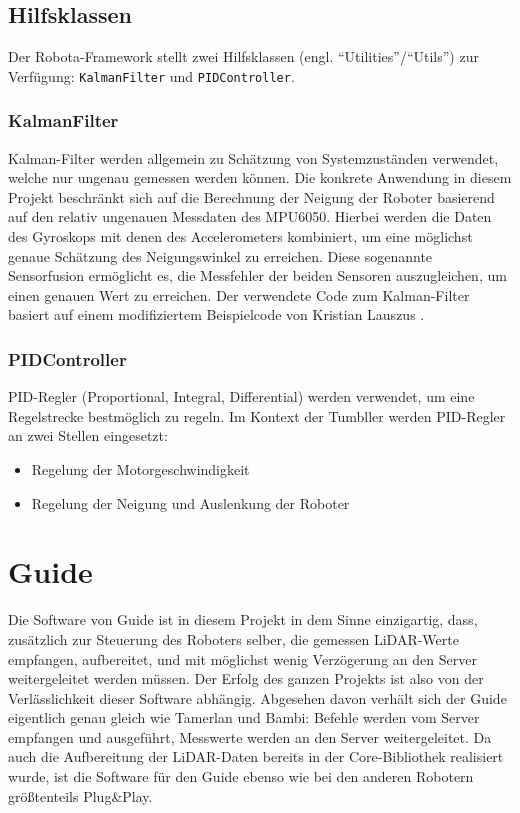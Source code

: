 \subsection{Hilfsklassen}
Der Robota-Framework stellt zwei Hilfsklassen (engl. ``Utilities''/``Utils'') zur Verfügung:
\texttt{KalmanFilter} und \texttt{PIDController}.

\subsubsection{KalmanFilter}
Kalman-Filter werden allgemein zu Schätzung von Systemzuständen verwendet,
welche nur ungenau gemessen werden können.
%
Die konkrete Anwendung in diesem Projekt beschränkt sich auf die Berechnung
der Neigung der Roboter basierend auf den relativ ungenauen Messdaten des MPU6050.
%
Hierbei werden die Daten des Gyroskops mit denen des Accelerometers kombiniert,
um eine möglichst genaue Schätzung des Neigungswinkel zu erreichen\cite{digikey-kalman}.
%
Diese sogenannte Sensorfusion ermöglicht es,
die Messfehler der beiden Sensoren auszugleichen,
um einen genauen Wert zu erreichen.
%
Der verwendete Code zum Kalman-Filter basiert auf einem modifiziertem Beispielcode von Kristian Lauszus \cite{lauszus}.

\subsubsection{PIDController}
PID-Regler (Proportional, Integral, Differential) werden verwendet,
um eine Regelstrecke bestmöglich zu regeln.
%
Im Kontext der Tumbller werden PID-Regler an zwei Stellen eingesetzt:
\begin{itemize}
    \item Regelung der Motorgeschwindigkeit
    \item Regelung der Neigung und Auslenkung der Roboter
\end{itemize}

\section{Guide}
\label{subsec:software_guide}
Die Software von Guide ist in diesem Projekt in dem Sinne einzigartig,
dass,
zusätzlich zur Steuerung des Roboters selber,
die gemessen LiDAR-Werte empfangen,
aufbereitet,
und mit möglichst wenig Verzögerung an den Server weitergeleitet werden müssen.
%
Der Erfolg des ganzen Projekts ist also von der Verlässlichkeit dieser Software abhängig.
%
Abgesehen davon verhält sich der Guide eigentlich genau gleich wie Tamerlan und Bambi:
%
Befehle werden vom Server empfangen und ausgeführt,
Messwerte werden an den Server weitergeleitet.
%
Da auch die Aufbereitung der LiDAR-Daten bereits in der Core-Bibliothek realisiert wurde,
ist die Software für den Guide ebenso wie bei den anderen Robotern größtenteils Plug\&Play.

